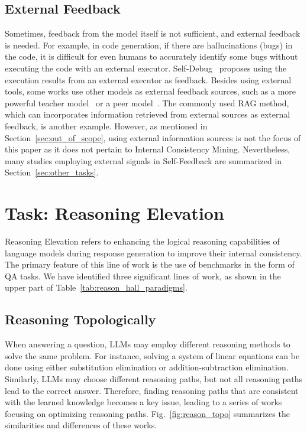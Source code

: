 \documentclass[lettersize,journal]{IEEEtran}
\begin{document}
\subsection{External Feedback}  \label{sec:external_feedback}


\noindent Sometimes, feedback from the model itself is not sufficient, and external feedback is needed. For example, in code generation, if there are hallucinations (bugs) in the code, it is difficult for even humans to accurately identify some bugs without executing the code with an external executor. Self-Debug~\cite{SelfDebug_24_ICLR_Google} proposes using the execution results from an external executor as feedback. Besides using external tools, some works use other models as external feedback sources, such as a more powerful teacher model~\cite{PERsD_23_EMNLP_NTU} or a peer model~\cite{Debate_23_arXiv_MIT}. The commonly used RAG method, which can incorporates information retrieved from external sources as external feedback, is another example. However, as mentioned in Section~\ref{sec:out_of_scope}, using external information sources is not the focus of this paper as it does not pertain to Internal Consistency Mining. Nevertheless, many studies employing external signals in Self-Feedback are summarized in Section~\ref{sec:other_tasks}.


\section{Task: Reasoning Elevation} \label{sec:reasoning_elevation}


\noindent Reasoning Elevation refers to enhancing the logical reasoning capabilities of language models during response generation to improve their internal consistency. The primary feature of this line of work is the use of benchmarks in the form of QA tasks. We have identified three significant lines of work, as shown in the upper part of Table~\ref{tab:reason_hall_paradigms}.


\subsection{Reasoning Topologically} \label{sec:reasoning_topologically}


\noindent When answering a question, LLMs may employ different reasoning methods to solve the same problem. For instance, solving a system of linear equations can be done using either substitution elimination or addition-subtraction elimination. Similarly, LLMs may choose different reasoning paths, but not all reasoning paths lead to the correct answer. Therefore, finding reasoning paths that are consistent with the learned knowledge becomes a key issue, leading to a series of works focusing on optimizing reasoning paths. Fig.~\ref{fig:reason_topo} summarizes the similarities and differences of these works.
\end{document}
